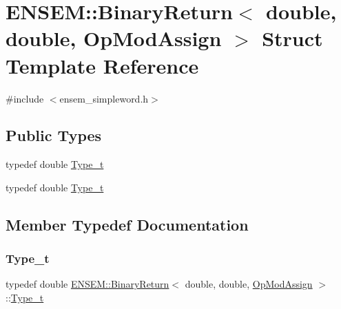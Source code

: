 \hypertarget{structENSEM_1_1BinaryReturn_3_01double_00_01double_00_01OpModAssign_01_4}{}\section{E\+N\+S\+EM\+:\+:Binary\+Return$<$ double, double, Op\+Mod\+Assign $>$ Struct Template Reference}
\label{structENSEM_1_1BinaryReturn_3_01double_00_01double_00_01OpModAssign_01_4}


{\ttfamily \#include $<$ensem\+\_\+simpleword.\+h$>$}

\subsection*{Public Types}
\begin{DoxyCompactItemize}
\item 
typedef double \mbox{\hyperlink{structENSEM_1_1BinaryReturn_3_01double_00_01double_00_01OpModAssign_01_4_a5d4ff64f4601dee1ca69a78e3ed694e0}{Type\+\_\+t}}
\item 
typedef double \mbox{\hyperlink{structENSEM_1_1BinaryReturn_3_01double_00_01double_00_01OpModAssign_01_4_a5d4ff64f4601dee1ca69a78e3ed694e0}{Type\+\_\+t}}
\end{DoxyCompactItemize}


\subsection{Member Typedef Documentation}
\mbox{\label{structENSEM_1_1BinaryReturn_3_01double_00_01double_00_01OpModAssign_01_4_a5d4ff64f4601dee1ca69a78e3ed694e0}} 
\subsubsection{\texorpdfstring{Type\_t}{Type\_t}\hspace{0.1cm}{\footnotesize\ttfamily [1/2]}}
{\footnotesize\ttfamily typedef double \mbox{\hyperlink{structENSEM_1_1BinaryReturn}{E\+N\+S\+E\+M\+::\+Binary\+Return}}$<$ double, double, \mbox{\hyperlink{structENSEM_1_1OpModAssign}{Op\+Mod\+Assign}} $>$\+::\mbox{\hyperlink{structENSEM_1_1BinaryReturn_3_01double_00_01double_00_01OpModAssign_01_4_a5d4ff64f4601dee1ca69a78e3ed694e0}{Type\+\_\+t}}}

